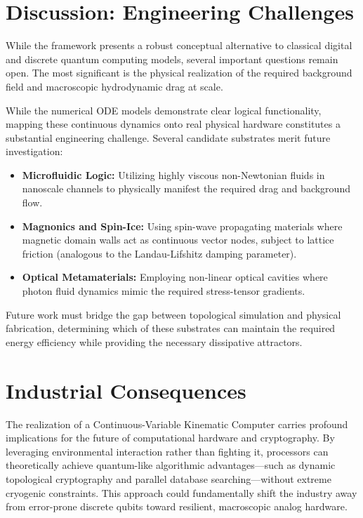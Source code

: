 \documentclass[12pt]{article}
\begin{document}
\section{Discussion: Engineering Challenges}
While the framework presents a robust conceptual alternative to classical digital and discrete quantum computing models, several important questions remain open. The most significant is the physical realization of the required background field and macroscopic hydrodynamic drag at scale. 

While the numerical ODE models demonstrate clear logical functionality, mapping these continuous dynamics onto real physical hardware constitutes a substantial engineering challenge. Several candidate substrates merit future investigation:
\begin{itemize}
    \item \textbf{Microfluidic Logic:} Utilizing highly viscous non-Newtonian fluids in nanoscale channels to physically manifest the required drag and background flow.
    \item \textbf{Magnonics and Spin-Ice:} Using spin-wave propagating materials where magnetic domain walls act as continuous vector nodes, subject to lattice friction (analogous to the Landau-Lifshitz damping parameter).
    \item \textbf{Optical Metamaterials:} Employing non-linear optical cavities where photon fluid dynamics mimic the required stress-tensor gradients.
\end{itemize}

Future work must bridge the gap between topological simulation and physical fabrication, determining which of these substrates can maintain the required energy efficiency while providing the necessary dissipative attractors.

\section{Industrial Consequences}
The realization of a Continuous-Variable Kinematic Computer carries profound implications for the future of computational hardware and cryptography. By leveraging environmental interaction rather than fighting it, processors can theoretically achieve quantum-like algorithmic advantages---such as dynamic topological cryptography and parallel database searching---without extreme cryogenic constraints. This approach could fundamentally shift the industry away from error-prone discrete qubits toward resilient, macroscopic analog hardware.
\end{document}

